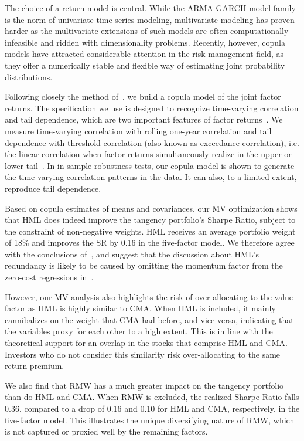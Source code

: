 The choice of a return model is central. While the ARMA-GARCH model family is the norm of univariate time-series modeling, multivariate modeling has proven harder as the multivariate extensions of such models are often computationally infeasible and ridden with dimensionality problems. Recently, however, copula models have attracted considerable attention in the risk management field, as they offer a numerically stable and flexible way of estimating joint probability distributions. 

Following closely the method of~\textcite{ChristoffersenLanglois2013}, we build a copula model of the joint factor returns. The specification we use is designed to recognize time-varying correlation and tail dependence, which are two important features of factor returns~\autocite{ChristoffersenLanglois2013}. We measure time-varying correlation with rolling one-year correlation and tail dependence with threshold correlation (also known as exceedance correlation), i.e. the linear correlation when factor returns simultaneously realize in the upper or lower tail~\autocite{AngChen2002}. In in-sample robustness tests, our copula model is shown to generate the time-varying correlation patterns in the data. It can also, to a limited extent, reproduce tail dependence.

Based on copula estimates of means and covariances, our MV optimization shows that HML does indeed improve the tangency portfolio's Sharpe Ratio, subject to the constraint of non-negative weights. HML receives an average portfolio weight of 18\% and improves the SR by 0.16 in the five-factor model. We therefore agree with the conclusions of~\textcite{Asness2015}, and suggest that the discussion about HML's redundancy is likely to be caused by omitting the momentum factor from the zero-cost regressions in~\textcite{FF2015}.

However, our MV analysis also highlights the risk of over-allocating to the value factor as HML is highly similar to CMA. When HML is included, it mainly cannibalizes on the weight that CMA had before, and vice versa, indicating that the variables proxy for each other to a high extent. This is in line with the theoretical support for an overlap in the stocks that comprise HML and CMA. Investors who do not consider this similarity risk over-allocating to the same return premium.

We also find that RMW has a much greater impact on the tangency portfolio than do HML and CMA. When RMW is excluded, the realized Sharpe Ratio falls 0.36, compared to a drop of 0.16 and 0.10 for HML and CMA, respectively, in the five-factor model. This illustrates the unique diversifying nature of RMW, which is not captured or proxied well by the remaining factors.

